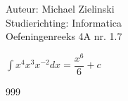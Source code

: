 \documentclass[a4paper]{article}
\begin{document}
\noindent \large Auteur: Michael Zielinski \\
\noindent \large Studierichting: Informatica \\
\noindent \large Oefeningenreeks 4A nr. 1.7 \\

\medskip 

\normalsize

$\displaystyle\int x^4 x^3 x^{-2} dx = \dfrac{x^6}{6} + c$

\begin{thebibliography}{999}
\end{thebibliography}
\end{document}
